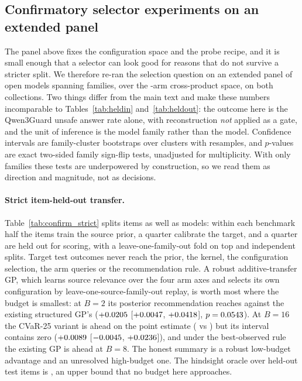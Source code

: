 \documentclass{article}
\begin{document}
\subsection{Confirmatory selector experiments on an extended panel}
\label{app:confirmatory}
The panel above fixes the configuration space and the probe recipe, and it is small enough that a
selector can look good for reasons that do not survive a stricter split. We therefore re-ran the
selection question on an extended panel of \pjcfModels{} open models spanning \pjcfFamilies{}
families, over the \pjcfArms{}-arm cross-product space, on both collections. Two things differ from
the main text and make these numbers incomparable to Tables~\ref{tab:heldin} and~\ref{tab:heldout}:
the outcome here is the Qwen3Guard unsafe answer rate alone, with reconstruction \emph{not} applied
as a gate, and the unit of inference is the model family rather than the model. Confidence intervals
are family-cluster bootstraps over \pjcfStatClusters{} clusters with \pjcfStatBoot{} resamples, and
$p$-values are exact two-sided family sign-flip tests, unadjusted for multiplicity. With only
\pjcfStatClusters{} families these tests are underpowered by construction, so we read them as
direction and magnitude, not as decisions.

\paragraph{Strict item-held-out transfer.} Table~\ref{tab:confirm_strict} splits items as well as
models: within each benchmark half the items train the source prior, a quarter calibrate the target,
and a quarter are held out for scoring, with a leave-one-family-out fold on top and
\pjcfStrictSeeds{} independent splits. Target test outcomes never reach the prior, the kernel, the
configuration selection, the arm queries or the recommendation rule. A robust additive-transfer GP,
which learns source relevance over the four arm axes and selects its own configuration by
leave-one-source-family-out replay, is worth most where the budget is smallest: at $B{=}2$ its
posterior recommendation reaches \pjcfStrictMSpostBTwo{} against the existing structured GP's
\pjcfStrictGPpostBTwo{} ($+0.0205$ [$+0.0047$,
$+0.0418$], $p=0.0543$). At $B{=}16$ the CVaR-25 variant is ahead
on the point estimate (\pjcfStrictCVpostBSixteen{} vs \pjcfStrictGPpostBSixteen{}) but its interval
contains zero ($+0.0089$ [$-0.0045$,
$+0.0236$]), and under the best-observed rule the existing GP is ahead at
$B{=}8$. The honest summary is a robust low-budget advantage and an unresolved high-budget one. The
hindsight oracle over held-out test items is \pjcfStrictOracle{}, an upper bound that no budget here
approaches.

\end{document}
